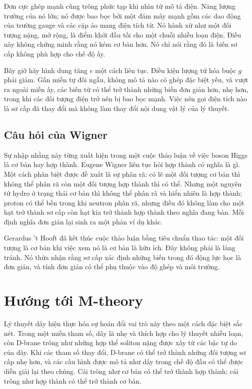 Đơn cực ghép mạnh cũng trông phức tạp khi nhìn từ mô tả điện. Năng lượng trường của nó lớn; nó được bao bọc bởi một đám mây mạnh gồm các dao động của trường gauge và các cặp ảo mang điện tích từ. Nó hành xử như một đối tượng nặng, mở rộng, là điểm khởi đầu tồi cho một chuỗi nhiễu loạn điện. Điều này không chứng minh rằng nó kém cơ bản hơn. Nó chỉ nói rằng đó là biến sơ cấp không phù hợp cho chế độ ấy.

Bây giờ hãy hình dung tăng \(e\) một cách liên tục. Điều kiện lượng tử hóa buộc \(g\) phải giảm. Gần miền tự đối ngẫu, không mô tả nào có ghép đặc biệt yếu, và vượt ra ngoài miền ấy, các biến từ có thể trở thành những biến đơn giản hơn, nhẹ hơn, trong khi các đối tượng điện trở nên bị bao bọc mạnh. Việc nên gọi điện tích nào là sơ cấp đã thay đổi mà không làm thay đổi nội dung vật lý của lý thuyết.

\subsection{Câu hỏi của Wigner}

Sự nhập nhằng này từng xuất hiện trong một cuộc thảo luận về việc boson Higgs là cơ bản hay hợp thành. Eugene Wigner liên tục hỏi hợp thành có nghĩa là gì. Một cách phân biệt được đề xuất là sự phân rã: có lẽ một đối tượng cơ bản thì không thể phân rã còn một đối tượng hợp thành thì có thể. Nhưng một nguyên tử hydro ở trạng thái cơ bản thì không thể phân rã và hiển nhiên là hợp thành; proton có thể bền trong khi neutron phân rã, nhưng điều đó không làm cho một hạt trở thành sơ cấp còn hạt kia trở thành hợp thành theo nghĩa đang bàn. Mỗi định nghĩa đơn giản lại sinh ra một phản ví dụ khác.

Gerardus 't Hooft đã kết thúc cuộc thảo luận bằng tiêu chuẩn thao tác: một đối tượng là cơ bản khi việc xem nó là cơ bản là hữu ích. Đây không phải là lảng tránh. Nó thừa nhận rằng sơ cấp xác định những biến trong đó động lực học là đơn giản, và tính đơn giản có thể phụ thuộc vào độ ghép và môi trường.

\section{Hướng tới M-theory}

Lý thuyết dây hiện thực hóa sự hoán đổi vai trò này theo một cách đặc biệt sắc nét. Trong một miền tham số, dây là nhẹ và thích hợp cho lý thuyết nhiễu loạn, còn D-brane trông như những hợp thể soliton nặng được xây từ các bậc tự do của dây. Khi các tham số thay đổi, D-brane có thể trở thành những đối tượng sơ cấp nhẹ hơn, và các cấu hình được mô tả như dây trong chế độ đầu có thể được diễn giải lại theo chúng. Cái trông như cơ bản có thể trở thành hợp thành; cái trông như hợp thành có thể trở thành cơ bản.

